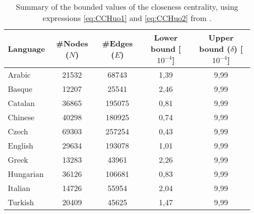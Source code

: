 \begin{table}[]
    \centering
    \begin{tabular}{l c c c c} \toprule
        \textbf{Language} & \textbf{\#Nodes} ($N$) & \textbf{\#Edges} ($E$) & \textbf{Lower bound} [$10^{-4}$] & \textbf{Upper bound} ($\delta$) [$10^{-4}$]  \\ \midrule
         Arabic & 21532 & 68743 & 1,39 & 9,99 \\ 
         Basque & 12207 & 25541 & 2,46 & 9,99 \\
         Catalan & 36865 & 195075 & 0,81 & 9,99 \\ 
         Chinese & 40298 & 180925 & 0,74 & 9,99\\ 
         Czech & 69303 & 257254 & 0,43 & 9,99 \\ 
         English & 29634 & 193078 & 1,01 & 9,99 \\ 
         Greek & 13283 & 43961 & 2,26 & 9,99 \\ 
         Hungarian & 36126 & 106681 & 0,83 & 9,99 \\ 
         Italian & 14726 & 55954 & 2,04 & 9,99 \\
         Turkish & 20409 & 45625 & 1,47 & 9,99 \\ \bottomrule
    \end{tabular}
    \caption{Summary of the bounded values of the closeness centrality, using expressions \eqref{eq:CCHuo1} and \eqref{eq:CCHuo2} from \cite{hu2022bounds}.}
    \label{tab:huo}
\end{table}